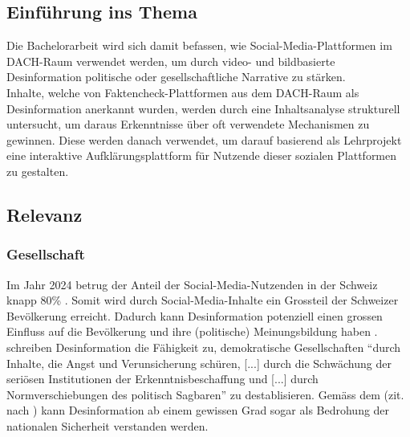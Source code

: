 \documentclass[12pt,a4paper]{article}        %
\begin{document}
\subsection{Einführung ins Thema}
Die Bachelorarbeit wird sich damit befassen, wie Social-Media-Plattformen im DACH-Raum verwendet werden, um durch video- und bildbasierte Desinformation politische oder gesellschaftliche Narrative zu stärken. \\
Inhalte, welche von Faktencheck-Plattformen aus dem DACH-Raum als Desinformation anerkannt wurden, werden durch eine Inhaltsanalyse strukturell untersucht, um daraus Erkenntnisse über oft verwendete Mechanismen zu gewinnen. Diese werden danach verwendet, um darauf basierend als Lehrprojekt eine interaktive Aufklärungsplattform für Nutzende dieser sozialen Plattformen zu gestalten.

\subsection{Relevanz}

\subsubsection{Gesellschaft}
Im Jahr 2024 betrug der Anteil der Social-Media-Nutzenden in der Schweiz knapp 80\% \parencite[22]{we_are_social_anteil_2024}. Somit wird durch Social-Media-Inhalte ein Grossteil der Schweizer Bevölkerung erreicht. Dadurch kann Desinformation potenziell einen grossen Einfluss auf die Bevölkerung und ihre (politische) Meinungsbildung haben \parencites[18]{grujic_warnhinweise_2024}[258]{hohlfeld_schlechte_2020}[1]{khan_fake_2021}. \\
\textcite[258]{hohlfeld_schlechte_2020} schreiben Desinformation die Fähigkeit zu, demokratische Gesellschaften “durch Inhalte, die Angst und Verunsicherung schüren, [...] durch die Schwächung der seriösen Institutionen der Erkenntnisbeschaffung und [...] durch Normverschiebungen des politisch Sagbaren” zu destablisieren. Gemäss dem \textcite{bundesministerium_des_innern_und_fur_heimat_desinformation_2022} (zit. nach \textcite[15]{teetz_social-media-post_2023}) kann Desinformation ab einem gewissen Grad sogar als Bedrohung der nationalen Sicherheit verstanden werden.
\end{document}
